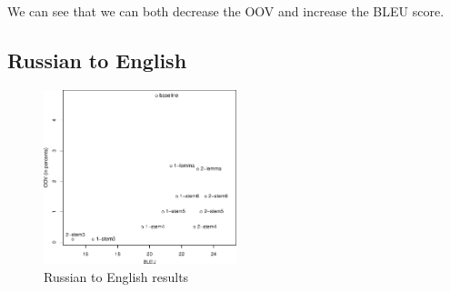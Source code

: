 \documentclass[11pt,letterpaper]{article}
\begin{document}
We can see that we can both decrease the OOV and increase the BLEU score.

\subsection{Russian to English}

\begin{figure}
\centering
\includegraphics[width=0.5\textwidth]{plot_enru}
\caption{Russian to English results}
\label{graf:enru}
\end{figure}
\end{document}
